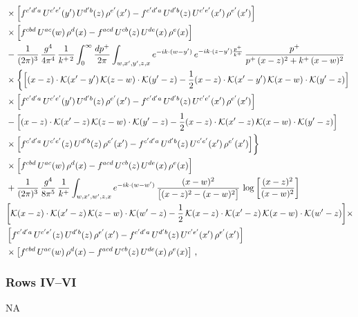 \documentclass[9pt]{article}
\numberwithin{equation}{section}
\begin{document}
\begin{align}
&\times\Big[f^{c'd'a}\,U^{c'e'}(y')\,U^{d'b}(z)\,\rho^{e'}(x')-f^{c'd'a}\,U^{d'b}(z)\,U^{c'e'}(x')\,\rho^{e'}(x')\Big]\notag\\
&\times\Big[f^{cbd}\,U^{ac}(w)\,\rho^{d}(x)-f^{acd}\,U^{cb}(z)\,U^{de}(x)\,\rho^{e}(x)\Big]\notag\\
&-\frac{1}{(2\pi)^{3}}\,\frac{g^{4}}{4\pi^{4}}\,\frac{1}{k^{+\,2}}\int_{0}^{\infty}\frac{dp^{+}}{2\pi}\int_{w,x',y',z,x}e^{-ik\cdot(w-y')}\,e^{-ik\cdot(z-y')\frac{p^{+}}{k^{+}}}\,\frac{p^{+}}{p^{+}\,(x-z)^{2}+k^{+}\,(x-w)^{2}}\notag\\
&\times\bigg\{\Big[(x-z)\cdot\mathcal{K}(x'-y')\,\mathcal{K}(z-w)\cdot\mathcal{K}(y'-z)-\frac{1}{2}(x-z)\cdot\mathcal{K}(x'-y')\,\mathcal{K}(x-w)\cdot\mathcal{K}(y'-z)\Big]\notag\\
&\times\Big[f^{c'd'a}\,U^{c'e'}(y')\,U^{d'b}(z)\,\rho^{e'}(x')-f^{c'd'a}\,U^{d'b}(z)\,U^{c'e'}(x')\,\rho^{e'}(x')\Big]\notag\\
&-\Big[(x-z)\cdot\mathcal{K}(x'-z)\,\mathcal{K}(z-w)\cdot\mathcal{K}(y'-z)-\frac{1}{2}(x-z)\cdot\mathcal{K}(x'-z)\,\mathcal{K}(x-w)\cdot\mathcal{K}(y'-z)\Big]\notag\\
&\times\Big[f^{c'd'a}\,U^{c'e'}(z)\,U^{d'b}(z)\,\rho^{e'}(x')-f^{c'd'a}\,U^{d'b}(z)\,U^{c'e'}(x')\,\rho^{e'}(x')\Big]\bigg\}\notag\\
&\times\Big[f^{cbd}\,U^{ac}(w)\,\rho^{d}(x)-f^{acd}\,U^{cb}(z)\,U^{de}(x)\,\rho^{e}(x)\Big]\notag\\
& +\frac{1}{(2\pi)^{3}}\,\frac{g^{4}}{8\pi^{5}}\,\frac{1}{k^{+}}\int_{w,x',w',z,x}e^{-ik\cdot(w-w')}\,\frac{(x-w)^{2}}{\big[(x-z)^{2}-(x-w)^{2}\big]}\,\log\left[\frac{(x-z)^{2}}{(x-w)^{2}}\right]\notag \\ &  \bigg[\mathcal{K}(x-z)\cdot\mathcal{K}(x'-z)\,\mathcal{K}(z-w)\cdot\mathcal{K}(w'-z)-\frac{1}{2}\,\mathcal{K}(x-z)\cdot\mathcal{K}(x'-z)\,\mathcal{K}(x-w)\cdot\mathcal{K}(w'-z)\bigg]   \times\notag \\ & \left[f^{c'd'a}\,U^{c'e'}(z)\,U^{d'b}(z)\,\rho^{e'}(x')-f^{c'd'a}\, U^{d'b}(z)\,U^{c'e'}(x')\,\rho^{e'}(x')\right]\notag\\ &\times\left[f^{cbd}\,U^{ac}(w)\,\rho^{d}(x) -f^{acd}\,U^{cb}(z)\,U^{de}(x)\,\rho^{e}(x)\right]\,,\label{eq:B-III3two}
\end{align}
\subsubsection*{Rows IV--VI} \textsc{NA}
\end{document}
